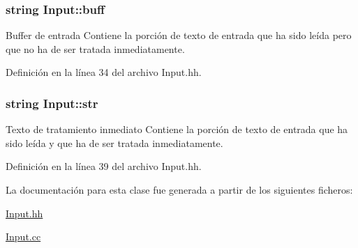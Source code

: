 \subsubsection[{\texorpdfstring{buff}{buff}}]{\setlength{\rightskip}{0pt plus 5cm}string Input\+::buff\hspace{0.3cm}{\ttfamily [private]}}\hypertarget{class_input_a680019c05e47ad35677d5cb692978d98}{}\label{class_input_a680019c05e47ad35677d5cb692978d98}


Buffer de entrada Contiene la porción de texto de entrada que ha sido leída pero que no ha de ser tratada inmediatamente. 



Definición en la línea 34 del archivo Input.\+hh.

\subsubsection[{\texorpdfstring{str}{str}}]{\setlength{\rightskip}{0pt plus 5cm}string Input\+::str\hspace{0.3cm}{\ttfamily [private]}}\hypertarget{class_input_a0c2550eda9a6250028748d8870f4e83f}{}\label{class_input_a0c2550eda9a6250028748d8870f4e83f}


Texto de tratamiento inmediato Contiene la porción de texto de entrada que ha sido leída y que ha de ser tratada inmediatamente. 



Definición en la línea 39 del archivo Input.\+hh.



La documentación para esta clase fue generada a partir de los siguientes ficheros\+:\begin{DoxyCompactItemize}
\item 
\hyperlink{_input_8hh}{Input.\+hh}\item 
\hyperlink{_input_8cc}{Input.\+cc}\end{DoxyCompactItemize}
